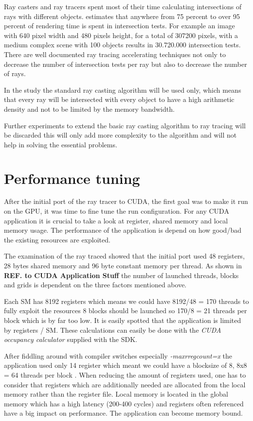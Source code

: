 Ray casters and ray tracers spent most of their time calculating intersections
of rays with different objects.  \citep{Whitted80} estimates
that anywhere from 75 percent to over 95 percent of rendering time is spent in
intersection tests. For example an image with 640 pixel width and 480 pixels
height, for a total of 307200 pixels, with a medium complex scene with 100
objects results in 30.720.000 intersection tests. There are well documented ray
tracing accelerating techniques not only to decrease the number of intersection
tests per ray but also to decrease the number of rays.

In the study the standard ray casting algorithm will be used only, which means
that every ray will be intersected with every object to have a high arithmetic
density and not to be limited by the memory bandwidth.

Further experiments to extend the basic ray casting algorithm to ray tracing 
will be discarded this will only add more complexity to the algorithm and will
not help in solving the essential problems. 

\section{Performance tuning} %
\label{sec:performance_tuning}

After the initial port of the ray tracer to \gls{CUDA}, the first goal was to 
make it run on the \gls{GPU}, it was time to fine tune the run configuration. 
For any \gls{CUDA} application it is crucial to take a look at register, shared 
memory and local memory usage. The performance of the application is depend on
how good/bad the existing resources are exploited.

The examination of the ray traced showed that the initial port used 48
registers, 28 bytes shared memory and 96 byte constant memory per thread. As
shown in \textbf{REF. to CUDA Application Stuff} the number of launched threads,
blocks and grids is dependent on the three factors mentioned above.

Each \gls{SM} has 8192 registers which means we could have 8192/48 = 170 threads
to fully exploit the resources 8 blocks should be launched so 170/8 = 21 threads per block which is by far too low. It is easily spotted that the application is
limited by registers / \gls{SM}. These calculations can easily be done with the \emph{CUDA occupancy calculator} supplied with the SDK. 

After fiddling around with compiler switches especially \emph{-maxrregcount=x}
the application used only 14 register which meant we could have a blocksize of
8, 8x8 = 64 threads per block . When reducing the amount of registers used, one
has to consider that registers which are additionally needed are allocated from
the local memory rather than the register file. Local memory is located in the
global memory which has a high latency (200-400 cycles) and registers often
referenced have a big impact on performance. The application can become memory
bound.

